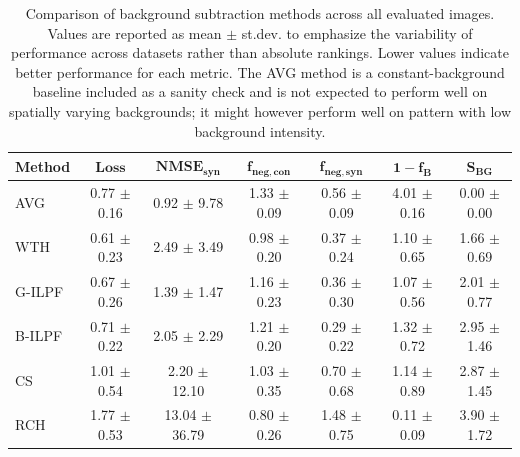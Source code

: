 \documentclass[iucr]{iucrjournals}
\begin{document}


\begin{table}[t]
\caption{Comparison of background subtraction methods across all evaluated images. Values are reported as mean $\pm$ st.dev. to emphasize the variability of performance across datasets rather than absolute rankings. Lower values indicate better performance for each metric. The AVG method is a constant-background baseline included as a sanity check and is not expected to perform well on spatially varying backgrounds; it might however perform well on pattern with low background intensity.}
\label{tab:method_performance_new}
\centering
\small
\setlength{\tabcolsep}{3pt}
\renewcommand{\arraystretch}{1.1}
\begin{tabular}{@{}lcccccc@{}}
\toprule
\textbf{Method} & $\mathbf{Loss}$ & $\mathbf{NMSE}_{\mathbf{syn}}$ & $\mathbf{f}_{\mathbf{neg,con}}$ & $\mathbf{f}_{\mathbf{neg,syn}}$ & $\mathbf{1-f_B}$ & $\mathbf{S}_{\mathbf{BG}}$ \\
\midrule
AVG & 0.77 $\pm$ 0.16 & 0.92 $\pm$ 9.78 & 1.33 $\pm$ 0.09 & 0.56 $\pm$ 0.09 & 4.01 $\pm$ 0.16 & 0.00 $\pm$ 0.00 \\
WTH & 0.61 $\pm$ 0.23 & 2.49 $\pm$ 3.49 & 0.98 $\pm$ 0.20 & 0.37 $\pm$ 0.24 & 1.10 $\pm$ 0.65 & 1.66 $\pm$ 0.69 \\

G-ILPF & 0.67 $\pm$ 0.26 & 1.39 $\pm$ 1.47 & 1.16 $\pm$ 0.23 & 0.36 $\pm$ 0.30 & 1.07 $\pm$ 0.56 & 2.01 $\pm$ 0.77 \\
B-ILPF & 0.71 $\pm$ 0.22 & 2.05 $\pm$ 2.29 & 1.21 $\pm$ 0.20 & 0.29 $\pm$ 0.22 & 1.32 $\pm$ 0.72 & 2.95 $\pm$ 1.46 \\
CS & 1.01 $\pm$ 0.54 & 2.20 $\pm$ 12.10 & 1.03 $\pm$ 0.35 & 0.70 $\pm$ 0.68 & 1.14 $\pm$ 0.89 & 2.87 $\pm$ 1.45 \\

RCH & 1.77 $\pm$ 0.53 & 13.04 $\pm$ 36.79 & 0.80 $\pm$ 0.26 & 1.48 $\pm$ 0.75 & 0.11 $\pm$ 0.09 & 3.90 $\pm$ 1.72 \\

\bottomrule
\end{tabular}
\end{table}
\end{document}
